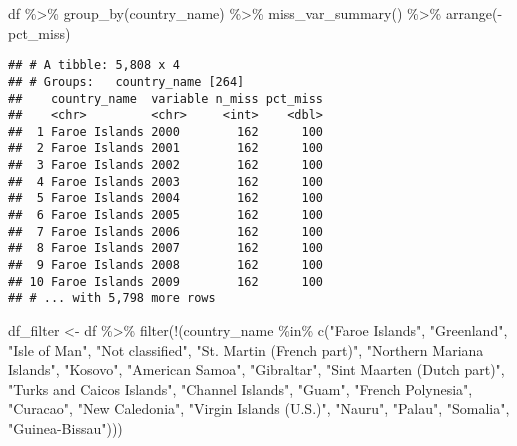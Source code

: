 \documentclass[11pt,a4paper,]{article}
\newenvironment{Shaded}{\begin{snugshade}}{\end{snugshade}}
\newcommand{\FunctionTok}[1]{\textcolor[rgb]{0.00,0.00,0.00}{#1}}
\newcommand{\NormalTok}[1]{#1}
\newcommand{\OtherTok}[1]{\textcolor[rgb]{0.56,0.35,0.01}{#1}}
\newcommand{\SpecialCharTok}[1]{\textcolor[rgb]{0.00,0.00,0.00}{#1}}
\newcommand{\StringTok}[1]{\textcolor[rgb]{0.31,0.60,0.02}{#1}}
\begin{document}
\begin{Shaded}
\begin{Highlighting}[]
\NormalTok{df }\SpecialCharTok{\%\textgreater{}\%}
  \FunctionTok{group\_by}\NormalTok{(country\_name) }\SpecialCharTok{\%\textgreater{}\%}
  \FunctionTok{miss\_var\_summary}\NormalTok{() }\SpecialCharTok{\%\textgreater{}\%} 
  \FunctionTok{arrange}\NormalTok{(}\SpecialCharTok{{-}}\NormalTok{pct\_miss)}
\end{Highlighting}
\end{Shaded}

\begin{verbatim}
## # A tibble: 5,808 x 4
## # Groups:   country_name [264]
##    country_name  variable n_miss pct_miss
##    <chr>         <chr>     <int>    <dbl>
##  1 Faroe Islands 2000        162      100
##  2 Faroe Islands 2001        162      100
##  3 Faroe Islands 2002        162      100
##  4 Faroe Islands 2003        162      100
##  5 Faroe Islands 2004        162      100
##  6 Faroe Islands 2005        162      100
##  7 Faroe Islands 2006        162      100
##  8 Faroe Islands 2007        162      100
##  9 Faroe Islands 2008        162      100
## 10 Faroe Islands 2009        162      100
## # ... with 5,798 more rows
\end{verbatim}

\begin{Shaded}
\begin{Highlighting}[]
\NormalTok{df\_filter }\OtherTok{\textless{}{-}}\NormalTok{ df }\SpecialCharTok{\%\textgreater{}\%} 
  \FunctionTok{filter}\NormalTok{(}\SpecialCharTok{!}\NormalTok{(country\_name }\SpecialCharTok{\%in\%} \FunctionTok{c}\NormalTok{(}\StringTok{"Faroe Islands"}\NormalTok{,}
                          \StringTok{"Greenland"}\NormalTok{,}
                          \StringTok{"Isle of Man"}\NormalTok{,}
                          \StringTok{"Not classified"}\NormalTok{,}
                          \StringTok{"St. Martin (French part)"}\NormalTok{,}
                          \StringTok{"Northern Mariana Islands"}\NormalTok{,}
                          \StringTok{"Kosovo"}\NormalTok{,}
                          \StringTok{"American Samoa"}\NormalTok{,}
                          \StringTok{"Gibraltar"}\NormalTok{,}
                          \StringTok{"Sint Maarten (Dutch part)"}\NormalTok{,}
                          \StringTok{"Turks and Caicos Islands"}\NormalTok{,}
                          \StringTok{"Channel Islands"}\NormalTok{,}
                          \StringTok{"Guam"}\NormalTok{,}
                          \StringTok{"French Polynesia"}\NormalTok{,}
                          \StringTok{"Curacao"}\NormalTok{,}
                          \StringTok{"New Caledonia"}\NormalTok{,}
                          \StringTok{"Virgin Islands (U.S.)"}\NormalTok{,}
                          \StringTok{"Nauru"}\NormalTok{,}
                          \StringTok{"Palau"}\NormalTok{,}
                          \StringTok{"Somalia"}\NormalTok{,}
                          \StringTok{"Guinea{-}Bissau"}\NormalTok{)))}
\end{Highlighting}
\end{Shaded}
\end{document}
